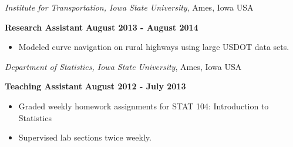 \documentclass[margin,line]{res}
\begin{document}
\begin{resume}
\vspace{-.1cm}

{\em Institute for Transportation, Iowa State University}, Ames, Iowa USA

\vspace{-.3cm}

{\bf Research Assistant} \hfill {\bf August 2013 - August 2014}\\
\vspace{-.3cm}
\begin{itemize}
\setlength\itemsep{0em}
\item Modeled curve navigation on rural highways using large USDOT data sets. 
\end{itemize}

\vspace{-.1cm}

{\em Department of Statistics, Iowa State University}, Ames, Iowa USA

\vspace{-.3cm}


{\bf Teaching Assistant} \hfill {\bf August 2012 - July 2013}\\
\vspace{-.3cm}
\begin{itemize}
\setlength\itemsep{0em}
\item Graded weekly homework assignments for STAT 104: Introduction to Statistics
\item Supervised lab sections twice weekly.
\end{itemize}


%







\end{resume}
\end{document}
